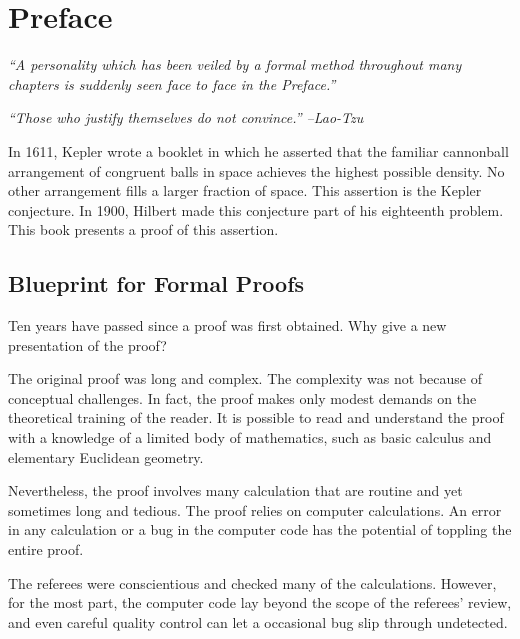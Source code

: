 
\chapter{Preface}

{

\narrower

{\it ``A personality which has been veiled by a formal method throughout many chapters
is suddenly seen face to face in the Preface.'' }

}

\bigskip

\centerline{\it ``Those who justify themselves do not convince.'' --Lao-Tzu}

\bigskip

In 1611, Kepler wrote a booklet in which he asserted that the familiar cannonball arrangement of congruent balls in space achieves the highest possible density.  No other arrangement fills a larger fraction of space.  This assertion is the Kepler conjecture.  In 1900, Hilbert made this conjecture part of his eighteenth problem.  This book presents a proof of this assertion.

\section{Blueprint for Formal Proofs}

Ten years have passed since a proof was first
obtained. Why give a new presentation of the proof?

The original proof was long and complex.  The complexity was not
because of conceptual challenges.  In fact, the proof makes only
modest demands on the theoretical training of the reader.  It is
possible to read and understand the proof with a knowledge of a
limited body of mathematics, such as basic calculus and elementary
Euclidean geometry.

Nevertheless, the proof involves many  calculation that are routine
and yet sometimes long and tedious.  The proof relies on computer calculations.  An error in any calculation or a bug in the
computer code has the potential of toppling the entire proof.

The referees were conscientious and checked many of the
calculations.  However, for the most part, the computer code lay beyond the scope of the referees' review, and even careful quality control can let a occasional bug slip through undetected.


